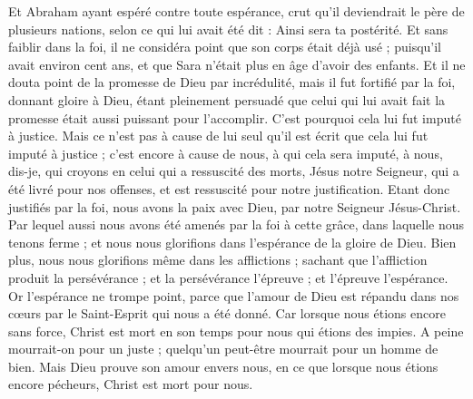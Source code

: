 \begin{multicols}{2}
Et Abraham ayant espéré contre toute espérance, crut qu'il deviendrait le père de plusieurs nations, selon ce qui lui avait été dit : Ainsi sera ta postérité.
Et sans faiblir dans la foi, il ne considéra point que son corps était déjà usé ; puisqu’il avait environ cent ans, et que Sara n’était plus en âge d'avoir des enfants.
Et il ne douta point de la promesse de Dieu par incrédulité, mais il fut fortifié par la foi, donnant gloire à Dieu,
étant pleinement persuadé que celui qui lui avait fait la promesse était aussi puissant pour l'accomplir.
C'est pourquoi cela lui fut imputé à justice.
Mais ce n’est pas à cause de lui seul qu’il est écrit que cela lui fut imputé à justice ;
c’est encore à cause de nous, à qui cela sera imputé, à nous, dis-je, qui croyons en celui qui a ressuscité des morts, Jésus notre Seigneur,
qui a été livré pour nos offenses, et est ressuscité pour notre justification.
\VerseOne{}Etant donc justifiés par la foi, nous avons la paix avec Dieu, par notre Seigneur Jésus-Christ.
Par lequel aussi nous avons été amenés par la foi à cette grâce, dans laquelle nous tenons ferme ; et nous nous glorifions dans l'espérance de la gloire de Dieu.
Bien plus, nous nous glorifions même dans les afflictions ; sachant que l'affliction produit la persévérance ;
et la persévérance l'épreuve ; et l'épreuve l'espérance.
Or l'espérance ne trompe point, parce que l'amour de Dieu est répandu dans nos cœurs par le Saint-Esprit qui nous a été donné.
Car lorsque nous étions encore sans force, Christ est mort en son temps pour nous qui étions des impies.
A peine mourrait-on pour un juste ; quelqu’un peut-être mourrait pour un homme de bien.
Mais Dieu prouve son amour envers nous, en ce que lorsque nous étions encore pécheurs, Christ est mort pour nous.

\end{multicols}
